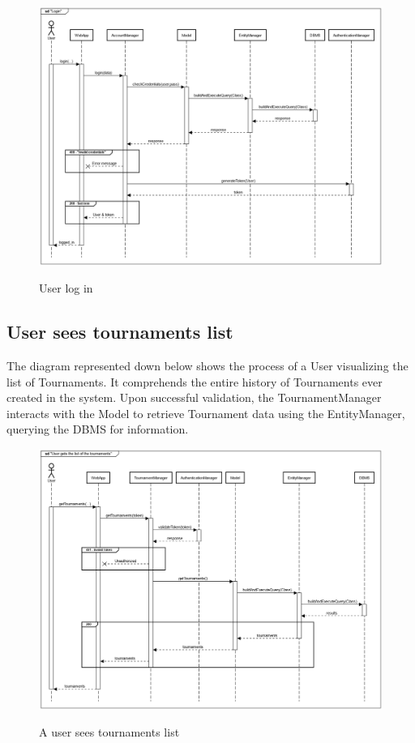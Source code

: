 \documentclass{Configuration_Files/Template}
\begin{document}
\begin{figure}[H]
\centering
\includegraphics[scale = 0.33]{Images/diagrams/sequences/UserLogsIn.png}\\
\caption{User log in}
\end{figure}

\subsection{User sees tournaments list}

The diagram represented down below shows the process of a User visualizing the list of Tournaments. It comprehends the entire history of Tournaments ever created in the system. Upon successful validation, the TournamentManager interacts with the Model to retrieve Tournament data using the EntityManager, querying the DBMS for information.

\begin{figure}[H]
\centering
\includegraphics[scale = 0.33]{Images/diagrams/sequences/getTournaments.png}\\
\caption{A user sees tournaments list }
\end{figure}
\end{document}
